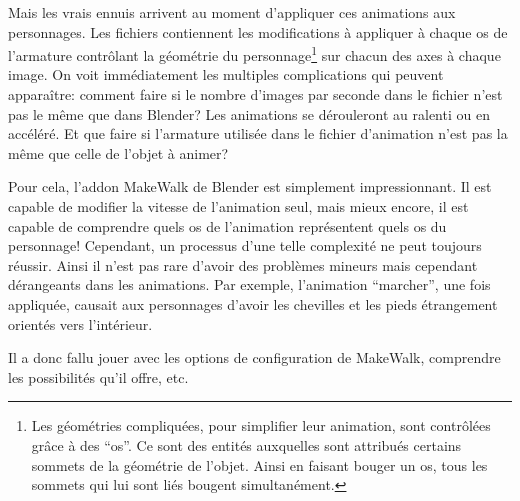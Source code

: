 Mais les vrais ennuis arrivent au moment d'appliquer ces animations aux personnages. Les fichiers contiennent les modifications à appliquer à chaque os de l'armature contrôlant la géométrie du personnage\footnote{Les géométries compliquées, pour simplifier leur animation, sont contrôlées grâce à des \enquote{os}. Ce sont des entités auxquelles sont attribués certains sommets de la géométrie de l'objet. Ainsi en faisant bouger un os, tous les sommets qui lui sont liés bougent simultanément.} sur chacun des axes à chaque image. On voit immédiatement les multiples complications qui peuvent apparaître: comment faire si le nombre d'images par seconde dans le fichier n'est pas le même que dans Blender? Les animations se dérouleront au ralenti ou en accéléré. Et que faire si l'armature utilisée dans le fichier d'animation n'est pas la même que celle de l'objet à animer?

Pour cela, l'addon MakeWalk de Blender est simplement impressionnant. Il est capable de modifier la vitesse de l'animation seul, mais mieux encore, il est capable de comprendre quels os de l'animation représentent quels os du personnage! Cependant, un processus d'une telle complexité ne peut toujours réussir. Ainsi il n'est pas rare d'avoir des problèmes mineurs mais cependant dérangeants dans les animations. Par exemple, l'animation \enquote{marcher}, une fois appliquée, causait aux personnages d'avoir les chevilles et les pieds étrangement orientés vers l'intérieur.

Il a donc fallu jouer avec les options de configuration de MakeWalk, comprendre les possibilités qu'il offre, etc.